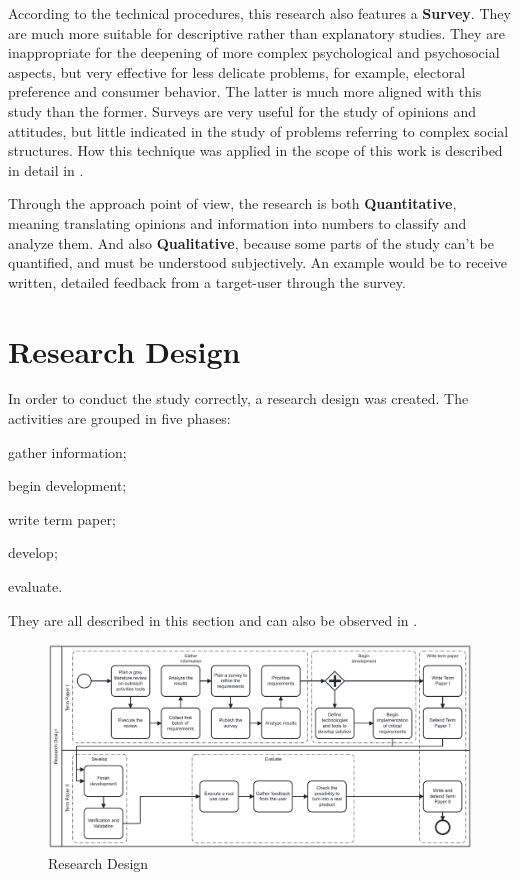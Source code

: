 According to the technical procedures, this research also features a \textbf{Survey}. They are much more suitable for descriptive rather than explanatory studies. They are inappropriate for the deepening of more complex psychological and psychosocial aspects, but very effective for less delicate problems, for example, electoral preference and consumer behavior. The latter is much more aligned with this study than the former. Surveys are very useful for the study of opinions and attitudes, but little indicated in the study of problems referring to complex social structures. How this technique was applied in the scope of this work is described in detail in .

Through the approach point of view, the research is both \textbf{Quantitative}, meaning translating opinions and information into numbers to classify and analyze them. And also \textbf{Qualitative}, because some parts of the study can't be quantified, and must be understood subjectively. An example would be to receive written, detailed feedback from a target-user through the survey.

\section{Research Design}\label{sec:met-3}

In order to conduct the study correctly, a research design was created. The activities are grouped in five phases:
\begin{inparaenum}[(1)]
  \item gather information;
  \item begin development;
  \item write term paper;
  \item develop;
  \item evaluate.
\end{inparaenum}
They are all described in this section and can also be observed in .

\begin{figure}[htb]
  \caption{Research Design}\label{fig:research-design}
  \begin{center}
    \includegraphics[width=16cm]{img/research design.pdf}
  \end{center}
\end{figure}

